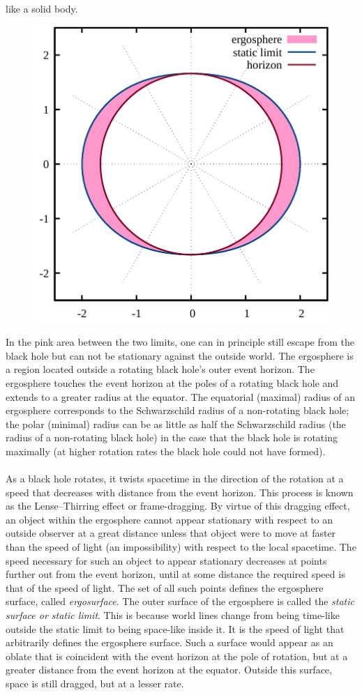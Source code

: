 \begin{enumerate}
\begin{equation}
	 \end{equation}
	 like a solid body.
	 \begin{figure}[h]
	 	\centering
	 	\includegraphics[width=0.7 \textwidth]{gfx/ergosphere.pdf}
	 \end{figure}
	 In the pink area between the two limits, one can in principle still escape from the black hole but can not be stationary against the outside world. The ergosphere is a region located outside a rotating black hole's outer event horizon. The ergosphere touches the event horizon at the poles of a rotating black hole and extends to a greater radius at the equator.  The equatorial (maximal) radius of an ergosphere corresponds to the Schwarzschild radius of a non-rotating black hole; the polar (minimal) radius can be as little as half the Schwarzschild radius (the radius of a non-rotating black hole) in the case that the black hole is rotating maximally (at higher rotation rates the black hole could not have formed). \\
	 \\
	 As a black hole rotates, it twists spacetime in the direction of the rotation at a speed that decreases with distance from the event horizon. This process is known as the Lense–Thirring effect or frame-dragging. By virtue of this dragging effect, an object within the ergosphere cannot appear stationary with respect to an outside observer at a great distance unless that object were to move at faster than the speed of light (an impossibility) with respect to the local spacetime. The speed necessary for such an object to appear stationary decreases at points further out from the event horizon, until at some distance the required speed is that of the speed of light. The set of all such points defines the ergosphere surface, called \emph{ergosurface}. The outer surface of the ergosphere is called the \emph{static surface or static limit}. This is because world lines change from being time-like outside the static limit to being space-like inside it. It is the speed of light that arbitrarily defines the ergosphere surface. Such a surface would appear as an oblate that is coincident with the event horizon at the pole of rotation, but at a greater distance from the event horizon at the equator. Outside this surface, space is still dragged, but at a lesser rate.
	 

\end{enumerate}
